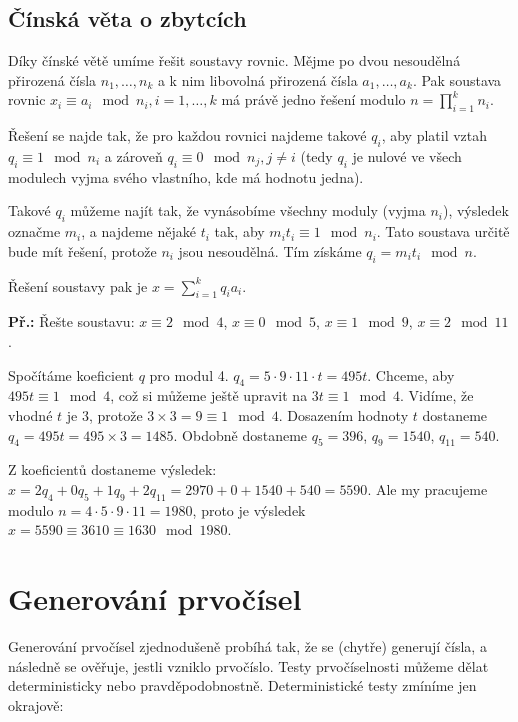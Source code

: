 \subsection{Čínská věta o zbytcích}
Díky čínské větě umíme řešit soustavy rovnic. Mějme po dvou nesoudělná přirozená
čísla $n_1, \ldots, n_k$ a k nim libovolná přirozená čísla $a_1,\ldots,a_k$. Pak
soustava rovnic $x_i \equiv a_i \mod n_i, i = 1,\ldots,k$ má právě jedno řešení
modulo $n = \prod_{i=1}^{k}n_i$.

Řešení se najde tak, že pro každou rovnici najdeme takové $q_i$, aby platil
vztah $q_i \equiv 1 \mod n_i$ a zároveň $q_i \equiv 0 \mod n_j, j \neq i$ (tedy
$q_i$ je nulové ve všech modulech vyjma svého vlastního, kde má hodnotu jedna).

Takové $q_i$ můžeme najít tak, že vynásobíme všechny moduly (vyjma $n_i$),
výsledek označme $m_i$, a najdeme nějaké $t_i$ tak, aby $m_it_i \equiv 1 \mod
n_i$. Tato soustava určitě bude mít řešení, protože $n_i$ jsou nesoudělná.
Tím získáme $q_i = m_it_i \mod n$.

Řešení soustavy pak je $x = \sum_{i=1}^{k}q_ia_i$.

\begin{exercise}
\textbf{Př.:} Řešte soustavu: $x \equiv 2 \mod 4$, $x \equiv 0 \mod 5$, $x
\equiv 1 \mod 9$, $x \equiv 2 \mod 11$.

Spočítáme koeficient $q$ pro modul 4. $q_4 = 5\cdot9\cdot11\cdot t = 495t$.
Chceme, aby $495t \equiv 1 \mod 4$, což si můžeme ještě upravit na $3t \equiv 1
\mod 4$. Vidíme, že vhodné $t$ je 3, protože $3\times 3 = 9 \equiv 1 \mod 4$.
Dosazením hodnoty $t$ dostaneme $q_4 = 495t = 495 \times 3 = 1485$. Obdobně
dostaneme $q_5 = 396$, $q_9 = 1540$, $q_{11} = 540$.

Z koeficientů dostaneme výsledek: $x = 2q_4 + 0q_5 + 1q_9 + 2q_{11} = 2970 + 0 +
1540 + 540 = 5590$. Ale my pracujeme modulo $n = 4\cdot5\cdot9\cdot11 = 1980$,
proto je výsledek $x = 5590 \equiv 3610 \equiv 1630 \mod 1980$.

\end{exercise}

\section{Generování prvočísel}
Generování prvočísel zjednodušeně probíhá tak, že se (chytře) generují čísla, a
následně se ověřuje, jestli vzniklo prvočíslo. Testy prvočíselnosti můžeme dělat
deterministicky nebo pravděpodobnostně. Deterministické testy zmíníme jen
okrajově:

